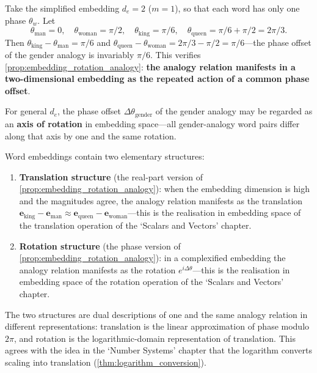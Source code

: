 \begin{example}\label{ex:gender_analogy_phase}
Take the simplified embedding $d_e=2$ ($m=1$), so that each word has only one phase $\theta_w$. Let
\[
\theta_{\text{man}}=0,\quad\theta_{\text{woman}}=\pi/2,\quad\theta_{\text{king}}=\pi/6,\quad\theta_{\text{queen}}=\pi/6+\pi/2=2\pi/3.
\]
Then $\theta_{\text{king}}-\theta_{\text{man}}=\pi/6$ and $\theta_{\text{queen}}-\theta_{\text{woman}}=2\pi/3-\pi/2=\pi/6$---the phase offset of the gender analogy is invariably $\pi/6$. This verifies \cref{prop:embedding_rotation_analogy}: \textbf{the analogy relation manifests in a two-dimensional embedding as the repeated action of a common phase offset}.

For general $d_e$, the phase offset $\Delta\theta_{\text{gender}}$ of the gender analogy may be regarded as an \textbf{axis of rotation} in embedding space---all gender-analogy word pairs differ along that axis by one and the same rotation.
\end{example}

\begin{remark}\label{rem:embedding_translation_rotation}
Word embeddings contain two elementary structures:
\begin{enumerate}[label=(\roman*)]
    \item \textbf{Translation structure} (the real-part version of \cref{prop:embedding_rotation_analogy}): when the embedding dimension is high and the magnitudes agree, the analogy relation manifests as the translation $\mathbf{e}_{\text{king}}-\mathbf{e}_{\text{man}}\approx\mathbf{e}_{\text{queen}}-\mathbf{e}_{\text{woman}}$---this is the realisation in embedding space of the translation operation of the `Scalars and Vectors' chapter.
    \item \textbf{Rotation structure} (the phase version of \cref{prop:embedding_rotation_analogy}): in a complexified embedding the analogy relation manifests as the rotation $e^{i\Delta\theta}$---this is the realisation in embedding space of the rotation operation of the `Scalars and Vectors' chapter.
\end{enumerate}
The two structures are dual descriptions of one and the same analogy relation in different representations: translation is the linear approximation of phase modulo $2\pi$, and rotation is the logarithmic-domain representation of translation. This agrees with the idea in the `Number Systems' chapter that the logarithm converts scaling into translation (\cref{thm:logarithm_conversion}).
\end{remark}

